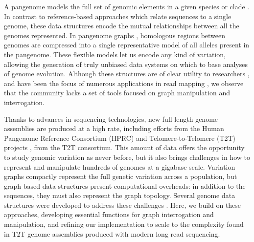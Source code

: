 \documentclass{bioinfo}
\begin{document}
A pangenome models the full set of genomic elements in a given species or clade \citep{Eizenga_2020}.
In contrast to reference-based approaches which relate sequences to a single genome, these data structures encode the mutual relationships between all the genomes represented.
In pangenome graphs \citep{Paten:2017}, homologous regions between genomes are compressed into a single representative model of all alleles present in the pangenome.
These flexible models let us encode any kind of variation, allowing the generation of truly unbiased data systems on which to base analyses of genome evolution.
Although these structures are of clear utility to researchers \citep{cpang2018}, and have been the focus of numerous applications in read mapping \cite{Garrison:2018,Baaijens_2019,Hickey:2020,Sibbesen_2021}, we observe that the community lacks a set of tools focused on graph manipulation and interrogation.




Thanks to advances in sequencing technologies, new full-length genome assemblies are produced at a high rate, including efforts from the Human Pangenome Reference Consortium (HPRC) and Telomere-to-Telomere (T2T) projects \citep{Miga:2020, Logsdon_2021, Nurk_2021}, from the T2T consortium.
This amount of data offers the opportunity to study genomic variation as never before, but it also brings challenges in how to represent and manipulate hundreds of genomes at a gigabase scale.
Variation graphs compactly represent the full genetic variation across a population, but graph-based data structures present computational overheads: in addition to the sequences, they must also represent the graph topology.
Several genome data structures were developed to address these challenges \citep{Eizenga_2020_BX}.
Here, we build on these approaches, developing essential functions for graph interrogation and manipulation, and refining our implementation to scale to the complexity found in T2T genome assemblies produced with modern long read sequencing. 
\end{document}
